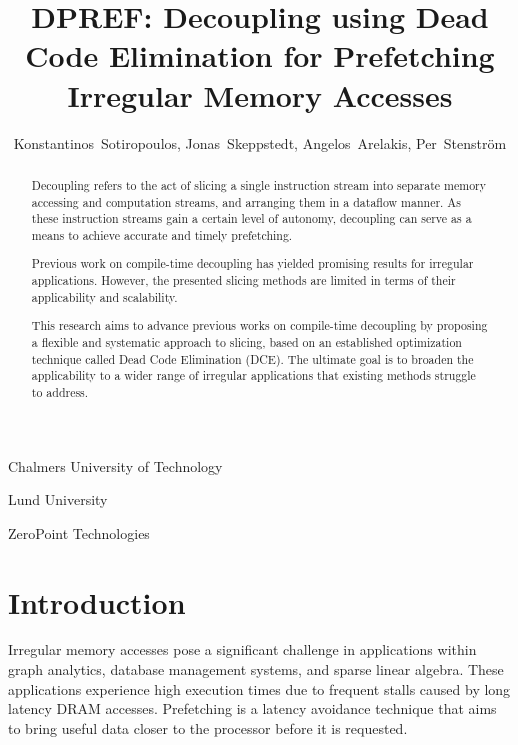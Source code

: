 \documentclass{acaces}
\begin{document}
\title{DPREF: Decoupling using Dead Code Elimination for Prefetching Irregular Memory Accesses}

\author{
Konstantinos~Sotiropoulos\comma{},
Jonas~Skeppstedt\comma{},
Angelos~Arelakis\comma{},
Per~Stenstr\"{o}m\comma{}
}

\address{1}{
  Chalmers University of Technology
}

\address{2}{
  Lund University
}

\address{3}{
  ZeroPoint Technologies
}


\pagestyle{empty}

\begin{abstract}

  Decoupling refers to the act of slicing a single instruction stream into separate memory accessing and computation streams, and arranging them in a dataflow manner.
  As these instruction streams gain a certain level of autonomy, decoupling can serve as a means to achieve accurate and timely prefetching.

  Previous work on compile-time decoupling has yielded promising results for irregular applications.
  However, the presented slicing methods are limited in terms of their applicability and scalability.

  This research aims to advance previous works on compile-time decoupling by proposing a flexible and systematic approach to slicing,
  based on an established optimization technique called Dead Code Elimination (DCE).
  The ultimate goal is to broaden the applicability to a wider range of irregular applications that existing methods struggle to address. \\

\end{abstract}


\section{Introduction}

Irregular memory accesses pose a significant challenge in applications within graph analytics, database management systems, and sparse linear algebra.
These applications experience high execution times due to frequent stalls caused by long latency DRAM accesses.
Prefetching is a latency avoidance technique that aims to bring useful data closer to the processor before it is requested.
\end{document}
